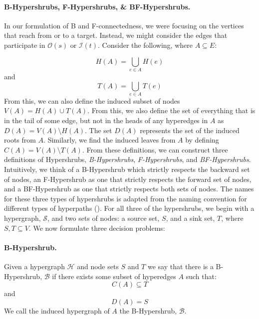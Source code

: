 \documentclass[12pt,twoside]{reedthesis}
\theoremstyle{definition}
\begin{document}
\paragraph{B-Hypershrubs, F-Hypershrubs, \& BF-Hypershrubs.}In our formulation of B and F-connectedness, we were focusing on the vertices that reach from or to a target. Instead, we might consider the edges that participate in $\mathcal{O}(s)$ or $\mathcal{I}(t)$. Consider the following, where $A \subseteq E$:

\begin{equation}
  H(A) = \bigcup_{e \in A} H(e)
\end{equation}
and
\begin{equation}
  T(A) = \bigcup_{e \in A} T(e)
\end{equation}
From this, we can also define the induced subset of nodes $V(A) = H(A) \cup T(A)$. From this, we also define the set of everything that is in the tail of some edge, but not in the heads of any hyperedges in $A$ as $D(A) = V(A) \setminus H(A)$. The set $D(A)$ represents the set of the induced roots from $A$. Similarly, we find the induced leaves from $A$ by defining $C(A) = V(A) \setminus T(A)$. From these definitions, we can construct three definitions of Hypershrubs, \textit{B-Hypershrubs}, \textit{F-Hypershrubs}, and \textit{BF-Hypershrubs}. Intuitively, we think of a B-Hypershrub which strictly respects the backward set of nodes, an F-Hypershrub as one that strictly respects the forward set of nodes, and a BF-Hypershrub as one that strictly respects both sets of nodes. The names for these three types of hypershrubs is adapted from the naming convention for different types of hyperpaths (\cite{Gallo1993}). For all three of the hypershrubs, we begin with a hypergraph, $\mathcal{S}$, and two sets of nodes: a source set, $S$, and a sink set, $T$, where $S,T \subseteq V$. We now formulate three decision problems:\par
\paragraph{B-Hypershrub.}Given a hypergraph $\mathcal{H}$ and node sets $S$ and $T$ we say that there is a B-Hypershrub, $\mathcal{B}$ if there exists some subset of hyperedges $A$ such that:
\begin{equation*}
  C(A) \subseteq T
\end{equation*}
and
\begin{equation*}
  D(A) = S
\end{equation*}
We call the induced hypergraph of $A$ the B-Hypershrub, $\mathcal{B}$.\par
\end{document}
